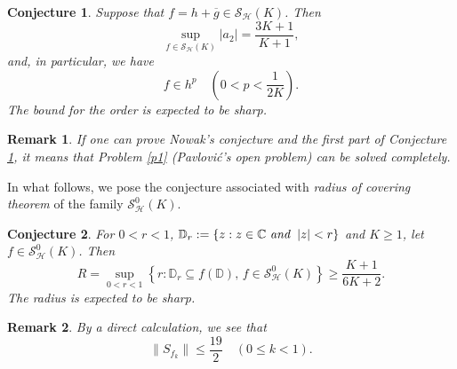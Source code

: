 \documentclass[11pt, reqno]{amsart}
\newtheorem{con}{Conjecture}
\newtheorem{rem}{Remark}
\numberwithin{equation}{section}
\newcommand{\abs}[1]{\left\vert#1\right\vert}
\newcommand{\C}{\mbox{$\mathbb{C}$}}
\newcommand{\D}{\mbox{$\mathbb{D}$}}
\begin{document}
\begin{con}\label{conj1}
Suppose that $f=h+\overline{g}\in\mathcal{S}_\mathcal{H}(K)$. Then
$$\sup\limits_{f\in\mathcal{S}_\mathcal{H}(K)}\abs{a_2}=\frac{3K+1}{K+1},$$
and, in particular, %
we have %
$$f\in h^p\quad \left(0<p<\frac{1}{2K}\right).$$
The bound for the order is expected to be sharp.
\end{con}


\begin{rem}\label{r0}
{\rm If one can prove Nowak’s
conjecture and the first part of Conjecture \ref{conj1}, it means that Problem \ref{p1} (Pavlovi\'{c}'s \textit{open problem}) can be \textit{solved} completely.}
\end{rem}





In what follows, we pose the conjecture associated with \textit{radius of covering theorem} of the family $\mathcal{S}^0_\mathcal{H}(K)$.
\begin{con} 
For $0<r<1$, $\D_r:=\{z: z\in\C\ {\it and}\ \abs z<r\}$ and  $K\geq1$, let $f\in {\mathcal{S}_\mathcal{H}^0(K)}$. Then 
$$R=\sup\limits_{0<r<1}\left\{r: \D_r\subseteq f(\D),\, f\in\mathcal{S}_\mathcal{H}^0(K)\right\}\geq\frac{K+1}{6K+2}.$$
The radius is expected to be sharp.
\end{con}

\begin{rem}\label{r3}
{\rm %
By a direct calculation, we see that $$\|S_{f_k}\|\leq\frac{19}{2}
\quad(0\leq k<1).$$}
\end{rem}



\end{document}
